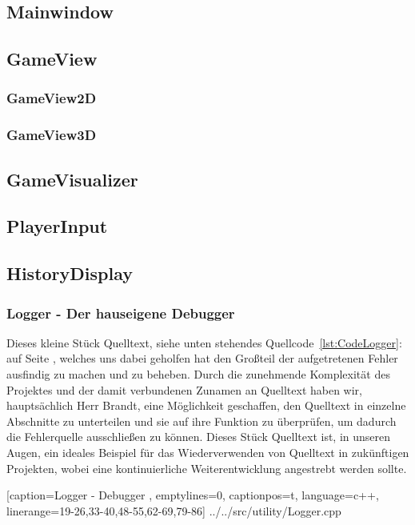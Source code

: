 \documentclass[a4paper]{scrartcl}
\begin{document}
\subsection{Mainwindow}\label{ch:Mainwindow}
\subsection{GameView}\label{ch:GameView}
\subsubsection{GameView2D}\label{ch:GameView2D}
\subsubsection{GameView3D}\label{ch:GameView3D}
\subsection{GameVisualizer}\label{ch:GameVisualizer}
\subsection{PlayerInput}\label{ch:PlayerInput}
\subsection{HistoryDisplay}\label{ch:HistoryDisplay}



\newpage
\subsubsection{Logger - Der hauseigene Debugger}\label{ch:Logger}
Dieses kleine Stück Quelltext, siehe unten stehendes Quellcode~\ref{lst:CodeLogger}: auf Seite \pageref{lst:CodeLogger}, welches uns dabei geholfen hat den Großteil der aufgetretenen Fehler ausfindig zu machen und zu beheben. Durch die zunehmende Komplexität des Projektes und der damit verbundenen Zunamen an Quelltext haben wir, hauptsächlich Herr Brandt, eine Möglichkeit geschaffen, den Quelltext in einzelne Abschnitte zu unterteilen und sie auf ihre Funktion zu überprüfen, um dadurch die Fehlerquelle ausschließen zu können. Dieses Stück Quelltext ist, in unseren Augen, ein ideales Beispiel für das Wiederverwenden von Quelltext in zukünftigen Projekten, wobei eine kontinuierliche Weiterentwicklung angestrebt werden sollte.

    [caption={Logger - Debugger} 	%
    	\label{lst:CodeLogger},			%
    emptylines=0,					%
    captionpos=t,					%
    language=c++,					%
    linerange={19-26,33-40,48-55,62-69,79-86}]%
{../../src/utility/Logger.cpp}		%
\end{document}
